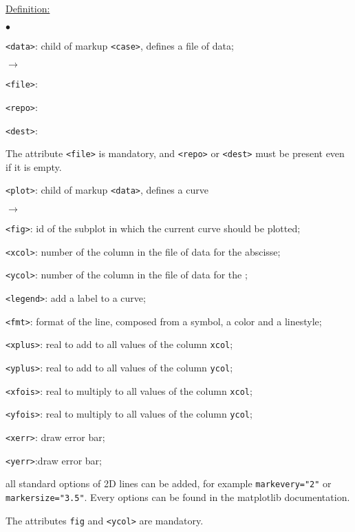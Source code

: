 \documentclass[a4paper,10pt,twoside]{article}
\begin{document}
\underline{Definition:}
\begin{list}{$\bullet$}{}
\item \texttt{<data>}: child of markup \texttt{<case>}, defines a file of data;
\begin{list}{$\rightarrow$}{}
\item \texttt{<file>}: 
\item \texttt{<repo>}: 
\item \texttt{<dest>}: 
\end{list}
The attribute \texttt{<file>} is mandatory, and \texttt{<repo>} or \texttt{<dest>} must be present
even if it is empty.

\item \texttt{<plot>}: child of markup \texttt{<data>}, defines a curve
\begin{list}{$\rightarrow$}{}
\item \texttt{<fig>}: id of the subplot in which the current curve should be plotted;
\item \texttt{<xcol>}: number of the column in the file of data for the abscisse;
\item \texttt{<ycol>}: number of the column in the file of data for the ;
\item \texttt{<legend>}: add a label to a curve;
\item \texttt{<fmt>}: format of the line, composed from a symbol, a color and a linestyle;
\item \texttt{<xplus>}: real to add to all values of the column \texttt{xcol};
\item \texttt{<yplus>}: real to add to all values of the column \texttt{ycol};
\item \texttt{<xfois>}: real to multiply to all values of the column \texttt{xcol};
\item \texttt{<yfois>}: real to multiply to all values of the column \texttt{ycol};
\item \texttt{<xerr>}: draw error bar;
\item \texttt{<yerr>}:draw error bar;
\item all standard options of 2D lines can be added, for example \texttt{markevery="2"}
or \texttt{markersize="3.5"}. Every options can be found in the matplotlib documentation.

The attributes \texttt{fig} and \texttt{<ycol>} are mandatory.
\end{list}


\end{list}
\end{document}
